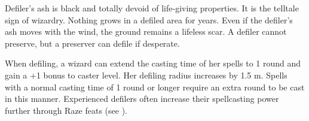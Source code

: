 Defiler's ash is black and totally devoid of life-giving properties. It is the telltale sign of wizardry. Nothing grows in a defiled area for years. Even if the defiler's ash moves with the wind, the ground remains a lifeless scar. A defiler cannot preserve, but a preserver can defile if desperate.

When defiling, a wizard can extend the casting time of her spells to 1 round and gain a +1 bonus to caster level. Her defiling radius increases by 1.5 m. Spells with a normal casting time of 1 round or longer require an extra round to be cast in this manner. Experienced defilers often increase their spellcasting power further through Raze feats (see ).